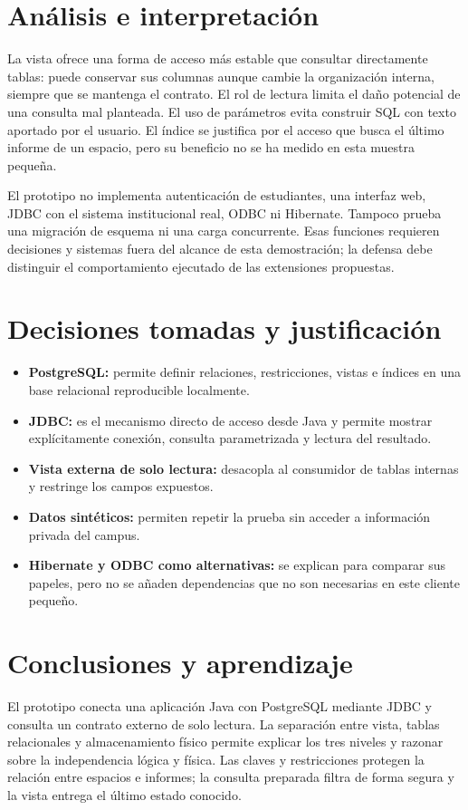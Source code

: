 \documentclass[a4paper,12pt]{article}
\begin{document}
\section{Análisis e interpretación}
La vista ofrece una forma de acceso más estable que consultar directamente tablas: puede conservar sus columnas aunque cambie la organización interna, siempre que se mantenga el contrato. El rol de lectura limita el daño potencial de una consulta mal planteada. El uso de parámetros evita construir SQL con texto aportado por el usuario. El índice se justifica por el acceso que busca el último informe de un espacio, pero su beneficio no se ha medido en esta muestra pequeña.

El prototipo no implementa autenticación de estudiantes, una interfaz web, JDBC con el sistema institucional real, ODBC ni Hibernate. Tampoco prueba una migración de esquema ni una carga concurrente. Esas funciones requieren decisiones y sistemas fuera del alcance de esta demostración; la defensa debe distinguir el comportamiento ejecutado de las extensiones propuestas.

\section{Decisiones tomadas y justificación}
\begin{itemize}[leftmargin=1.2cm]
  \item \textbf{PostgreSQL:} permite definir relaciones, restricciones, vistas e índices en una base relacional reproducible localmente.
  \item \textbf{JDBC:} es el mecanismo directo de acceso desde Java y permite mostrar explícitamente conexión, consulta parametrizada y lectura del resultado.
  \item \textbf{Vista externa de solo lectura:} desacopla al consumidor de tablas internas y restringe los campos expuestos.
  \item \textbf{Datos sintéticos:} permiten repetir la prueba sin acceder a información privada del campus.
  \item \textbf{Hibernate y ODBC como alternativas:} se explican para comparar sus papeles, pero no se añaden dependencias que no son necesarias en este cliente pequeño.
\end{itemize}

\section{Conclusiones y aprendizaje}
El prototipo conecta una aplicación Java con PostgreSQL mediante JDBC y consulta un contrato externo de solo lectura. La separación entre vista, tablas relacionales y almacenamiento físico permite explicar los tres niveles y razonar sobre la independencia lógica y física. Las claves y restricciones protegen la relación entre espacios e informes; la consulta preparada filtra de forma segura y la vista entrega el último estado conocido.
\end{document}
